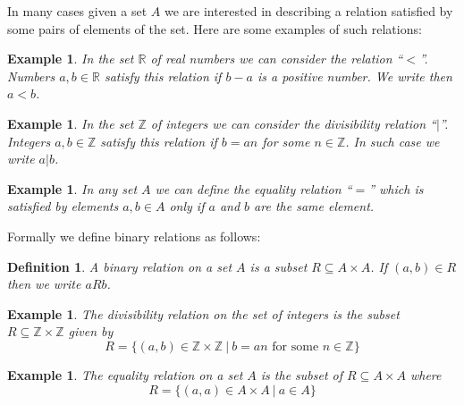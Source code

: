 \documentclass[11pt, letterpaper, oneside]{report}
\theoremstyle{pplain}
\newtheorem{ITERMVALUE THM}[theorem]{Intermediate Value Theorem}
\newtheorem{HEINEBOREL THM}[theorem]{Heine-Borel Theorem}
\newtheorem{UMETR THM}[theorem]{Urysohn Metrization Theorem}
\newtheorem{UMETR2 THM}[theorem]{Urysohn Metrization Theorem (v.2)}
\theoremstyle{ddefinition}
\newtheorem{definition}[theorem]{Definition}
\newtheorem{example}[theorem]{Example}
\theoremstyle{nnn}
\newtheorem{TDA NN}[theorem]{Topological Data Analysis. }
\theoremstyle{eexercise}
\newcommand{\Z}{{\mathbb Z}}
\newcommand{\R}{{\mathbb R}}
\begin{document}
In many cases given a set $A$ we are interested in describing a relation satisfied by some pairs of elements 
of the set. Here are some examples of such relations:

\begin{example}
In the set $\R$ of real numbers we can consider the relation ``$<$''.  Numbers $a, b\in \R$ satisfy this relation if 
$b-a$ is a positive number. We write then $a< b$.  
\end{example}

\begin{example}
In the set $\Z$ of integers we can consider the divisibility relation ``$|$''.  Integers $a, b\in \Z$ satisfy this relation 
if $b = an$ for some $n\in \Z$. In such case we write $a | b$.  
\end{example}

\begin{example}
In any set $A$ we can define the equality relation ``$=$'' which is satisfied by elements $a, b\in A$ only if 
$a$ and $b$ are the same element.  
\end{example}

Formally we define binary relations as follows: 

\begin{definition}
\label{BINARYREL DEF}
A \emph{binary relation}  on a set $A$ is a subset $R \subseteq A\times A$. 
If $(a, b) \in R$ then we  write $a R b$.  
\end{definition}

\begin{example}
The divisibility relation on the set of integers is the subset $R\subseteq \Z\times \Z$ given by 
$$R = \{ (a, b)\in \Z\times \Z \ | \ b = an \text{ for some } n\in \Z \}$$
\end{example}

\begin{example}
The equality relation on a set $A$ is the subset of $R \subseteq A\times A$ where 
$$R = \{(a, a)\in A\times A \ | \ a\in  A\}$$
\end{example}
\end{document}
